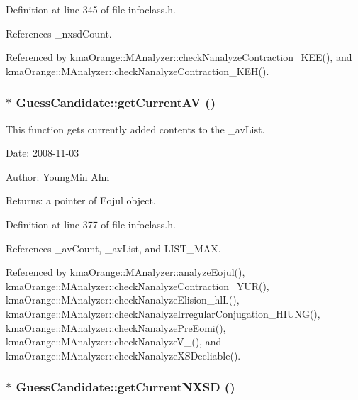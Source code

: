 Definition at line 345 of file infoclass.h.

References \_\-nxsdCount.

Referenced by kmaOrange::MAnalyzer::checkNanalyzeContraction\_\-KEE(), and kmaOrange::MAnalyzer::checkNanalyzeContraction\_\-KEH().\hypertarget{classGuessCandidate_e63d62596168193e824ffb43275ab0a5}{
\subsubsection[{getCurrentAV}]{$\ast$ GuessCandidate::getCurrentAV ()}}
\label{classGuessCandidate_e63d62596168193e824ffb43275ab0a5}


This function gets currently added contents to the \_\-avList. 

\begin{Desc}
\item[Date:]2008-11-03 \end{Desc}
\begin{Desc}
\item[Author:]YoungMin Ahn \end{Desc}
\begin{Desc}
\item[Returns:]a pointer of Eojul object. \end{Desc}


Definition at line 377 of file infoclass.h.

References \_\-avCount, \_\-avList, and LIST\_\-MAX.

Referenced by kmaOrange::MAnalyzer::analyzeEojul(), kmaOrange::MAnalyzer::checkNanalyzeContraction\_\-YUR(), kmaOrange::MAnalyzer::checkNanalyzeElision\_\-hlL(), kmaOrange::MAnalyzer::checkNanalyzeIrregularConjugation\_\-HIUNG(), kmaOrange::MAnalyzer::checkNanalyzePreEomi(), kmaOrange::MAnalyzer::checkNanalyzeV\_\-(), and kmaOrange::MAnalyzer::checkNanalyzeXSDecliable().\hypertarget{classGuessCandidate_afe6b140e724f2bc31805c6b78f42978}{
\subsubsection[{getCurrentNXSD}]{$\ast$ GuessCandidate::getCurrentNXSD ()}}
\label{classGuessCandidate_afe6b140e724f2bc31805c6b78f42978}


